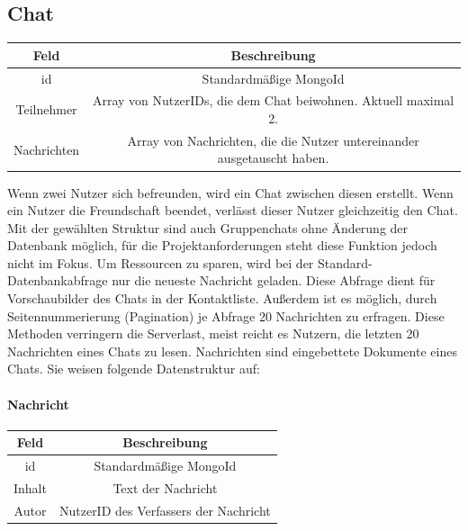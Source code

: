 \subsection{Chat}
\begin{center}
    \begin{tabular}{ |c|c| }
        \hline
        Feld & Beschreibung  \\
        \hline
        id & Standardmäßige MongoId \\
        Teilnehmer & Array von NutzerIDs, die dem Chat beiwohnen. Aktuell maximal 2. \\
        Nachrichten & Array von Nachrichten, die die Nutzer untereinander ausgetauscht haben. \\
        \hline
    \end{tabular}
    \cite{DB3} \cite{DB4}
\end{center}
Wenn zwei Nutzer sich befreunden, wird ein Chat zwischen diesen erstellt. Wenn ein Nutzer die Freundschaft beendet, verlässt dieser Nutzer gleichzeitig den Chat. Mit der gewählten Struktur sind auch Gruppenchats ohne Änderung der Datenbank möglich, für die Projektanforderungen steht diese Funktion jedoch nicht im Fokus.
Um Ressourcen zu sparen, wird bei der Standard-Datenbankabfrage nur die neueste Nachricht geladen. Diese Abfrage dient für Vorschaubilder des Chats in der Kontaktliste. Außerdem ist es möglich, durch Seitennummerierung (Pagination) je Abfrage 20 Nachrichten zu erfragen. Diese Methoden verringern die Serverlast, meist reicht es Nutzern, die letzten 20 Nachrichten eines Chats zu lesen.
Nachrichten sind eingebettete Dokumente eines Chats. Sie weisen folgende Datenstruktur auf:

\paragraph{Nachricht}
\begin{center}
    \begin{tabular}{ |c|c| }
        \hline
        Feld & Beschreibung  \\
        \hline
        id & Standardmäßige MongoId \\
        Inhalt & Text der Nachricht \\
        Autor & NutzerID des Verfassers der Nachricht \\
        \hline
    \end{tabular}
    \cite{DB3} \cite{DB4}
\end{center}

